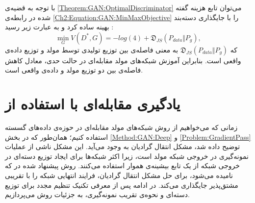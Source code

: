 با توجه به قضیه‌ی
\ref{Theorem:GAN:OptimalDiscriminator}
می‌توان تابع هزینه گفته شده در رابطه‌ی 
    \ref{Ch2:Equation:GAN:MinMaxObjective}
را با جایگذاری دسته‌بند بهینه ساده کرد و به عبارت زیر رسید
     \cite{Goodfellow2014}:
\begin{equation}
  \min_G  V(D^*, G) = -log(4) + \mathfrak{D}_{JS}(P_{data} \Vert P_g),
\end{equation}
که 
$\mathfrak{D}_{JS}(P_{data} \Vert P_g)$
به معنی فاصله‌ی
بین توزیع تولیدی توسط مولد و توزیع داده‌ی واقعی است.
\corollary
\label{Corollary:GAN:JSDecrese}
بنابراین آموزش شبکه‌های مولد مقابله‌ای در حالت حدی، معادل کاهش فاصله‌ی 
بین دو توزیع مولد و داده‌ی واقعی است.

 \section{یادگیری مقابله‌ای با استفاده از }
 \label{Method:GumbelSoftmax}
 زمانی که می‌خواهیم از روش شبکه‌های مولد مقابله‌ای
در حوزه‌ی داده‌های گسسته استفاده کنیم؛
 همان‌طور که در بخش
 \ref{Method:GAN:Deep}
 و
 \ref{Problem:GradientPass}
  توضیح داده شد، مشکل انتقال گرادیان به وجود می‌آيد. 
این مشکل ناشی از عملیات نمونه‌گیری در خروجی شبکه  مولد است، زیرا اکثر شبکه‌ها برای ایجاد توزیع دسته‌ای در خروجی شبکه از یک تابع بیشینه‌‌ی هموار استفاده می‌کنند.
روش پیشنهاد شده در 
 \cite{kusner2016gans}
 که
 نامیده می‌شود، برای حل مشکل انتقال گرادیان، فرایند انتهایی شبکه را با تقریبی مشتق‌پذیر جایگذاری می‌کند.
 \newline
 در ادامه پس از معرفی تکنیک تنظیم مجدد برای توزیع دسته‌ای و نحوه‌ی تقریب نمونه‌گیری، به جزئیات روش 
می‌پردازیم.

